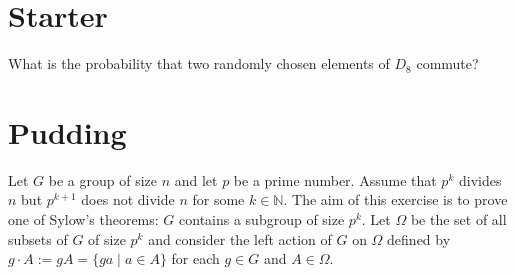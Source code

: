 \documentclass[answers]{exam}
\begin{document}
\section*{Starter}
\begin{questions}
\question%
What is the probability that two randomly chosen elements of $D_{8}$ commute?

\end{questions}

\section*{Pudding}
\begin{questions}
\question%
Let $G$ be a group of size $n$ and let $p$ be a prime number. Assume that $p^{k}$ divides $n$ but $p^{k+1}$ does not divide $n$ for some $k \in \mathbb{N}$. The aim of this exercise is to prove one of Sylow's theorems: $G$ contains a subgroup of size $p^{k}$. Let $\Omega$ be the set of all subsets of $G$ of size $p^{k}$ and consider the left action of $G$ on $\Omega$ defined by $g \cdot A:=g A=\{g a \mid a \in A\}$ for each $g \in G$ and $A \in \Omega$.

\end{questions}
\end{document}
